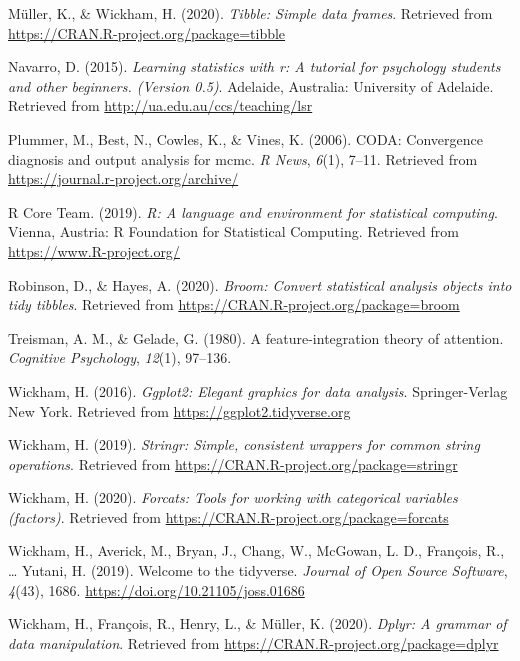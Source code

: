 \documentclass[
  english,
  man]{apa6}
\begin{document}
\leavevmode\hypertarget{ref-R-tibble}{}%
Müller, K., \& Wickham, H. (2020). \emph{Tibble: Simple data frames}. Retrieved from \url{https://CRAN.R-project.org/package=tibble}

\leavevmode\hypertarget{ref-R-lsr}{}%
Navarro, D. (2015). \emph{Learning statistics with r: A tutorial for psychology students and other beginners. (Version 0.5)}. Adelaide, Australia: University of Adelaide. Retrieved from \url{http://ua.edu.au/ccs/teaching/lsr}

\leavevmode\hypertarget{ref-R-coda}{}%
Plummer, M., Best, N., Cowles, K., \& Vines, K. (2006). CODA: Convergence diagnosis and output analysis for mcmc. \emph{R News}, \emph{6}(1), 7--11. Retrieved from \url{https://journal.r-project.org/archive/}

\leavevmode\hypertarget{ref-R-base}{}%
R Core Team. (2019). \emph{R: A language and environment for statistical computing}. Vienna, Austria: R Foundation for Statistical Computing. Retrieved from \url{https://www.R-project.org/}

\leavevmode\hypertarget{ref-R-broom}{}%
Robinson, D., \& Hayes, A. (2020). \emph{Broom: Convert statistical analysis objects into tidy tibbles}. Retrieved from \url{https://CRAN.R-project.org/package=broom}

\leavevmode\hypertarget{ref-treisman1980feature}{}%
Treisman, A. M., \& Gelade, G. (1980). A feature-integration theory of attention. \emph{Cognitive Psychology}, \emph{12}(1), 97--136.

\leavevmode\hypertarget{ref-R-ggplot2}{}%
Wickham, H. (2016). \emph{Ggplot2: Elegant graphics for data analysis}. Springer-Verlag New York. Retrieved from \url{https://ggplot2.tidyverse.org}

\leavevmode\hypertarget{ref-R-stringr}{}%
Wickham, H. (2019). \emph{Stringr: Simple, consistent wrappers for common string operations}. Retrieved from \url{https://CRAN.R-project.org/package=stringr}

\leavevmode\hypertarget{ref-R-forcats}{}%
Wickham, H. (2020). \emph{Forcats: Tools for working with categorical variables (factors)}. Retrieved from \url{https://CRAN.R-project.org/package=forcats}

\leavevmode\hypertarget{ref-R-tidyverse}{}%
Wickham, H., Averick, M., Bryan, J., Chang, W., McGowan, L. D., François, R., \ldots{} Yutani, H. (2019). Welcome to the tidyverse. \emph{Journal of Open Source Software}, \emph{4}(43), 1686. \url{https://doi.org/10.21105/joss.01686}

\leavevmode\hypertarget{ref-R-dplyr}{}%
Wickham, H., François, R., Henry, L., \& Müller, K. (2020). \emph{Dplyr: A grammar of data manipulation}. Retrieved from \url{https://CRAN.R-project.org/package=dplyr}
\end{document}
